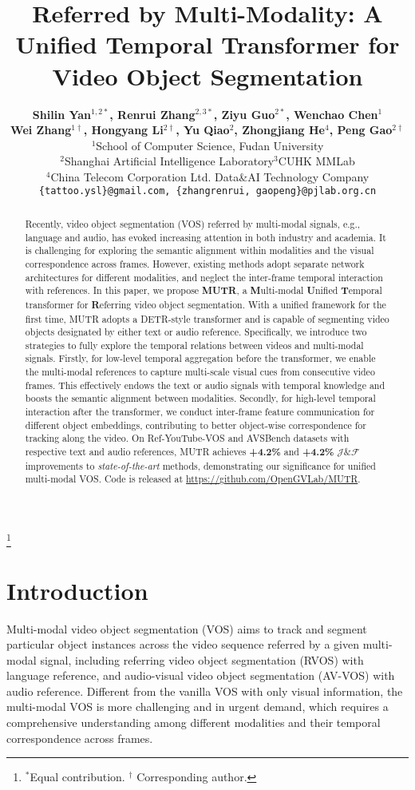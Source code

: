 \documentclass{article}
\title{Referred by Multi-Modality: A Unified Temporal Transformer for Video Object Segmentation}
\author{\hspace{-0.25cm}\textbf{Shilin Yan$^{1,2*}$, Renrui Zhang$^{2,3*}$, Ziyu Guo$^{2*}$, Wenchao Chen$^{1}$}\\ 
  \hspace{-0.25cm}\textbf{Wei Zhang$^{1 \dagger}$, Hongyang Li$^{2\dagger}$, Yu Qiao$^{2}$, Zhongjiang He$^{4}$, Peng Gao$^{2\dagger}$}\vspace{0.3cm}\\
  \hspace{-0.25cm}$^1$School of Computer Science, Fudan University \\
  \hspace{-0.25cm}$^2$Shanghai Artificial Intelligence Laboratory\quad $^3$CUHK MMLab \\
  \hspace{-0.25cm}$^4$China Telecom Corporation Ltd. Data\&AI Technology Company\vspace{0.1cm}\\
  \texttt{\{tattoo.ysl\}@gmail.com, \{zhangrenrui, gaopeng\}@pjlab.org.cn} \\
}
\newcommand\blfootnote[1]{\begingroup
  \renewcommand\thefootnote{}\footnote{#1}\addtocounter{footnote}{-1}\endgroup
}
\begin{document}
\blfootnote{\noindent $^{*}$Equal contribution. 
$^{\dagger}$ Corresponding author.}

\maketitle

\begin{abstract}

Recently, video object segmentation (VOS) referred by multi-modal signals, e.g., language and audio, has evoked increasing attention in both industry and academia. It is challenging for exploring the semantic alignment within modalities and the visual correspondence across frames.
However, existing methods adopt separate network architectures for different modalities, and neglect the inter-frame temporal interaction with references. In this paper, we propose \textbf{MUTR}, a \textbf{M}ulti-modal \textbf{U}nified \textbf{T}emporal transformer for \textbf{R}eferring video object segmentation. With a unified framework for the first time, MUTR adopts a DETR-style transformer and is capable of segmenting video objects designated by either text or audio reference. Specifically, we introduce two strategies to fully explore the temporal relations between videos and multi-modal signals. 
Firstly, for low-level temporal aggregation before the transformer, we enable the multi-modal references to capture multi-scale visual cues from consecutive video frames. This effectively endows the text or audio signals with temporal knowledge and boosts the semantic alignment between modalities.
Secondly, for high-level temporal interaction after the transformer, we conduct inter-frame feature communication for different object embeddings, contributing to better object-wise correspondence for tracking along the video.
On Ref-YouTube-VOS and AVSBench datasets with respective text and audio references, MUTR achieves \textbf{+4.2\%} and \textbf{+4.2\%} $\mathcal{J}\&\mathcal{F}$ improvements to \textit{state-of-the-art} methods, demonstrating our significance for unified multi-modal VOS. Code is released at \url{https://github.com/OpenGVLab/MUTR}.

\end{abstract}

\section{Introduction}\label{sec:introduction}
Multi-modal video object segmentation (VOS) aims to track and segment particular object instances across the video sequence referred by a given multi-modal signal, including referring video object segmentation (RVOS) with language reference, and audio-visual video object segmentation (AV-VOS) with audio reference.
Different from the vanilla VOS with only visual information, the multi-modal VOS is more challenging and in urgent demand, which requires a comprehensive understanding among different modalities and their temporal correspondence across frames.
\end{document}
